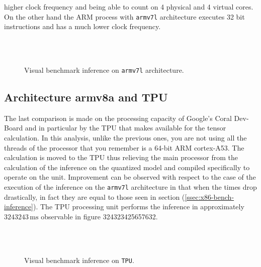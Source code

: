higher clock frequency and being able to count on 4 physical and 4 virtual
cores. 
On the other hand the ARM process with \texttt{armv7l} architecture executes 32
bit instructions and has a much lower clock frequency.
%
\begin{figure}[htb]
	\centering
	 \\
	 \\
	\caption{Visual benchmark inference on \texttt{armv7l} architecture.}
	\label{fig:armv7l-bench}
\end{figure}
%
\subsection{Architecture armv8a and TPU}
\label{ssec:tpu}
%
%
The last comparison is made on the processing capacity of Google's Coral
Dev-Board and in particular by the TPU that makes available for the tensor
calculation.
In this analysis, unlike the previous ones, you are not using all the threads of
the processor that you remember is a 64-bit ARM cortex-A53. 
The calculation is moved to the TPU thus relieving the main processor from the
calculation of the inference on the quantized model and compiled specifically to
operate on the unit.
Improvement can be observed with respect to the case of the execution of the
inference on the \texttt{armv7l} architecture in that when the times drop
drastically, in fact they are equal to those seen in section
(\ref{ssec:x86-bench-inference}).  
The TPU processing unit performs the inference in approximately $3243243 \,\si{\milli\second}$ observable in figure
324323425657632.
%
%
\begin{figure}[htb]
	\centering
	 \\
	 \\
	\caption{Visual benchmark inference on \texttt{TPU}.}
	\label{fig:TPU-bench}
\end{figure}














